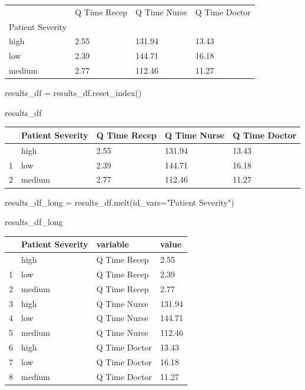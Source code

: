 \documentclass[
  letterpaper,
  DIV=11,
  numbers=noendperiod]{scrreprt}
\newenvironment{Shaded}{}{}
\newcommand{\NormalTok}[1]{\textcolor[rgb]{0.14,0.16,0.18}{#1}}
\newcommand{\OperatorTok}[1]{\textcolor[rgb]{0.14,0.16,0.18}{#1}}
\newcommand{\StringTok}[1]{\textcolor[rgb]{0.01,0.18,0.38}{#1}}
\begin{document}
\begin{longtable}[]{@{}llll@{}}
\toprule\noalign{}
& Q Time Recep & Q Time Nurse & Q Time Doctor \\
Patient Severity & & & \\
\midrule\noalign{}
\endhead
\bottomrule\noalign{}
\endlastfoot
high & 2.55 & 131.94 & 13.43 \\
low & 2.39 & 144.71 & 16.18 \\
medium & 2.77 & 112.46 & 11.27 \\
\end{longtable}

\begin{Shaded}
\begin{Highlighting}[]
\NormalTok{results\_df }\OperatorTok{=}\NormalTok{ results\_df.reset\_index()}

\NormalTok{results\_df}
\end{Highlighting}
\end{Shaded}

\begin{longtable}[]{@{}lllll@{}}
\toprule\noalign{}
& Patient Severity & Q Time Recep & Q Time Nurse & Q Time Doctor \\
\midrule\noalign{}
\endhead
\bottomrule\noalign{}
\endlastfoot
0 & high & 2.55 & 131.94 & 13.43 \\
1 & low & 2.39 & 144.71 & 16.18 \\
2 & medium & 2.77 & 112.46 & 11.27 \\
\end{longtable}

\begin{Shaded}
\begin{Highlighting}[]
\NormalTok{results\_df\_long }\OperatorTok{=}\NormalTok{ results\_df.melt(id\_vars}\OperatorTok{=}\StringTok{"Patient Severity"}\NormalTok{)}

\NormalTok{results\_df\_long}
\end{Highlighting}
\end{Shaded}

\begin{longtable}[]{@{}llll@{}}
\toprule\noalign{}
& Patient Severity & variable & value \\
\midrule\noalign{}
\endhead
\bottomrule\noalign{}
\endlastfoot
0 & high & Q Time Recep & 2.55 \\
1 & low & Q Time Recep & 2.39 \\
2 & medium & Q Time Recep & 2.77 \\
3 & high & Q Time Nurse & 131.94 \\
4 & low & Q Time Nurse & 144.71 \\
5 & medium & Q Time Nurse & 112.46 \\
6 & high & Q Time Doctor & 13.43 \\
7 & low & Q Time Doctor & 16.18 \\
8 & medium & Q Time Doctor & 11.27 \\
\end{longtable}
\end{document}
